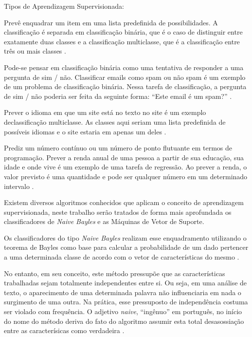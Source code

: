 \documentclass[
	12pt,				%
	openright,			%
	oneside,			%
	a4paper,			%
	english,			%
	spanish,			%
	brazil				%
	]{abntex2}
\begin{document}
	Tipos de Aprendizagem Supervisionada:

	 	
			Prevê enquadrar um item em uma lista predefinida de possibilidades. A classificação é separada em classificação binária, que é o caso de distinguir entre exatamente duas classes e a classificação multiclasse, que é a classificação entre três ou mais  classes \cite {guido_muller}. 
			
			Pode-se pensar em classificação binária como uma tentativa de responder a uma pergunta de sim / não. Classificar emails como spam ou não spam é um exemplo de um problema de classificação binária. Nessa tarefa de classificação, a pergunta de sim / não poderia ser feita da seguinte forma: ``Este email é um spam?'' \cite {guido_muller}.
			
			Prever o idioma em que um site está no texto no site é um exemplo declassificação multiclasse. As classes aqui seriam uma lista predefinida de possíveis idiomas e o site estaria em apenas um deles \cite {guido_muller}.

			Prediz um número contínuo  ou um número de ponto flutuante em termos de programação. Prever a renda anual de uma pessoa a partir de sua educação, sua idade e onde vive é um exemplo de uma tarefa de regressão. Ao prever a renda, o valor previsto é uma quantidade e pode ser qualquer número em um determinado intervalo \cite {guido_muller}.
	
	Existem diversos algoritmos conhecidos que aplicam o conceito de aprendizagem supervisionada, neste trabalho serão tratados de forma mais aprofundada os classificadores de \emph{Naive Bayles} e as Máquinas de Vetor de Suporte.
	
	
	Os classificadores do tipo \emph{Naive Bayles} realizam esse enquadramento utilizando o teorema de Bayles como base para calcular a probabilidade de um dado pertencer a uma determinada classe de acordo com o vetor de características do mesmo \cite{rish}.
	 
	No entanto, em seu conceito, este método pressupõe que as características trabalhadas sejam totalmente independentes entre si. Ou seja, em uma análise de texto, o aparecimento de uma determinada palavra não influenciaria em nada o surgimento de uma outra. Na prática, esse pressuposto de independência costuma ser violado com frequência. O adjetivo \emph{naive}, ``ingênuo'' em português, no início do nome do método deriva do fato do algoritmo assumir esta total desasossiação entre as caracterísicas como verdadeira \cite{raschka}.
		
\end{document}
